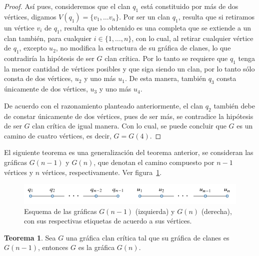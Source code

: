 \documentclass[12pt]{book}
\theoremstyle{definition}
\newtheorem{theorem}{Teorema}[chapter]
\begin{document}
\begin{proof}
Así pues, consideremos que el clan $q_1$ está constituido por más de dos vértices, digamos $V(q_1)=\{v_1,\dots v_n\}$. Por ser un clan $q_1$, resulta que si retiramos un vértice $v_i$ de $q_1$, resulta que lo obtenido es una completa que se extiende a un clan también, para cualquier $i\in \{1,\dots,n\}$, con lo cual, al retirar cualquier vértice de $q_1$, excepto $u_2$, no modifica la estructura de su gráfica de clanes, lo que contradiría la hipótesis de ser $G$ clan crítica. Por lo tanto se requiere que $q_1$ tenga la menor cantidad de vértices posibles y que siga siendo un clan, por lo tanto sólo consta de dos vértices, $u_2$ y uno más $u_1$. De esta manera, también $q_3$ consta únicamente de dos vértices, $u_3$ y uno más $u_4$.

De acuerdo con el razonamiento planteado anteriormente, el clan $q_2$ también debe de constar únicamente de dos vértices, pues de ser más, se contradice la hipótesis de ser $G$ clan crítica de igual manera. Con lo cual, se puede concluir que $G$ es un camino de cuatro vértices, es decir, $G=G(4)$.
\end{proof}

El siguiente teorema es una generalización del teorema anterior, se consideran las gráficas $G(n-1)$ y $G(n)$, que denotan el camino compuesto por $n-1$ vértices y $n$ vértices, respectivamente. Ver figura~\ref{F7}.

\begin{figure}[!htbp]
	\centering
	\includegraphics[scale=1.2]{Fig6.pdf}
	\caption{Esquema de las gráficas $G(n-1)$ (izquierda) y $G(n)$ (derecha), con sus respectivas etiquetas de acuerdo a sus vértices.\label{F7}}
\end{figure}

\begin{theorem}
Sea $G$ una gráfica clan crítica tal que su gráfica de clanes es $G(n-1)$, entonces $G$ es la gráfica $G(n)$.
\end{theorem}
\end{document}
